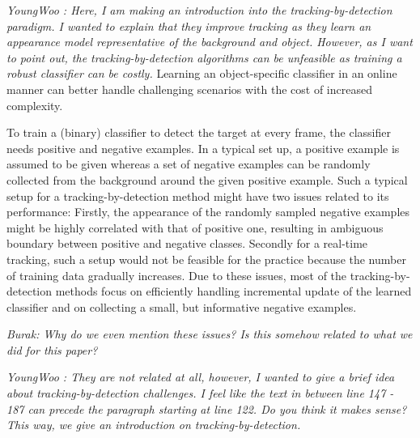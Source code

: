 \documentclass[10pt,twocolumn,letterpaper]{article}
\newcounter{ct}
\begin{document}
{\it YoungWoo : Here, I am making an introduction
into the tracking-by-detection paradigm. I wanted to explain that they improve tracking as they learn an appearance model representative of the background and object. However, as I want to point out, the tracking-by-detection algorithms can be unfeasible as training a robust classifier can be costly. } Learning
an object-specific classifier in an online manner can better handle
challenging scenarios with the cost of increased complexity.

To train a (binary) classifier to detect the target at every frame,
the classifier needs positive and negative examples. In a typical set
up, a positive example is assumed to be given whereas a set of
negative examples can be randomly collected from the background around
the given positive example. Such a typical setup for a
tracking-by-detection method might have two issues related to its
performance: Firstly, the appearance of the randomly sampled negative
examples might be highly correlated with that of positive one,
resulting in ambiguous boundary between positive and negative
classes. Secondly for a real-time tracking, such a setup would not be
feasible for the practice because the number of training data
gradually increases. Due to these issues, most of the
tracking-by-detection methods focus on efficiently handling
incremental update of the learned classifier and on collecting a
small, but informative negative examples.

{\it Burak: Why do we even mention these issues? Is this somehow
  related to what we did for this paper?}
  
{\it YoungWoo : They are not related at all, however, I wanted to give a brief idea about tracking-by-detection challenges. I feel like the text in between line 147 - 187 can precede the paragraph starting at line 122. Do you think it makes sense? This way, we give an introduction on tracking-by-detection.}

\end{document}
